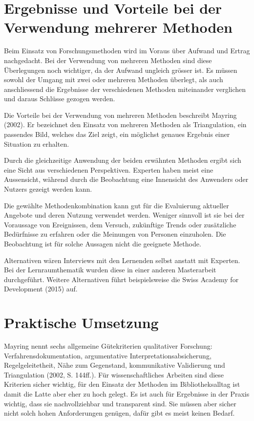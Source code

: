 \documentclass[a4paper,
fontsize=11pt,
oneside,
numbers=noperiodatend,
parskip=half-,
bibliography=totoc,
final
]{scrartcl}
\begin{document}
\section*{Ergebnisse und Vorteile bei der Verwendung mehrerer
Methoden}\label{ergebnisse-und-vorteile-bei-der-verwendung-mehrerer-methoden}

Beim Einsatz von Forschungsmethoden wird im Voraus über Aufwand und
Ertrag nachgedacht. Bei der Verwendung von mehreren Methoden sind diese
Überlegungen noch wichtiger, da der Aufwand ungleich grösser ist. Es
müssen sowohl der Umgang mit zwei oder mehreren Methoden überlegt, als
auch anschliessend die Ergebnisse der verschiedenen Methoden miteinander
verglichen und daraus Schlüsse gezogen werden.

Die Vorteile bei der Verwendung von mehreren Methoden beschreibt Mayring
(2002). Er bezeichnet den Einsatz von mehreren Methoden als
Triangulation, ein passendes Bild, welches das Ziel zeigt, ein möglichst
genaues Ergebnis einer Situation zu erhalten.

Durch die gleichzeitige Anwendung der beiden erwähnten Methoden ergibt
sich eine Sicht aus verschiedenen Perspektiven. Experten haben meist
eine Aussensicht, während durch die Beobachtung eine Innensicht des
Anwenders oder Nutzers gezeigt werden kann.

Die gewählte Methodenkombination kann gut für die Evaluierung aktueller
Angebote und deren Nutzung verwendet werden. Weniger sinnvoll ist sie
bei der Voraussage von Ereignissen, dem Versuch, zukünftige Trends oder
zusätzliche Bedürfnisse zu erfahren oder die Meinungen von Personen
einzuholen. Die Beobachtung ist für solche Aussagen nicht die geeignete
Methode.

Alternativen wären Interviews mit den Lernenden selbst anstatt mit
Experten. Bei der Lernraumthematik wurden diese in einer anderen
Masterarbeit durchgeführt. Weitere Alternativen führt beispielsweise die
Swiss Academy for Development (2015) auf.

\section*{Praktische Umsetzung}\label{praktische-umsetzung}

Mayring nennt sechs allgemeine Gütekriterien qualitativer Forschung:
Verfahrensdokumentation, argumentative Interpretationsabsicherung,
Regelgeleitetheit, Nähe zum Gegenstand, kommunikative Validierung und
Triangulation (2002, S. 144ff.). Für wissenschaftliches Arbeiten sind
diese Kriterien sicher wichtig, für den Einsatz der Methoden im
Bibliotheksalltag ist damit die Latte aber eher zu hoch gelegt. Es ist
auch für Ergebnisse in der Praxis wichtig, dass sie nachvollziehbar und
transparent sind. Sie müssen aber sicher nicht solch hohen Anforderungen
genügen, dafür gibt es meist keinen Bedarf.
\end{document}
